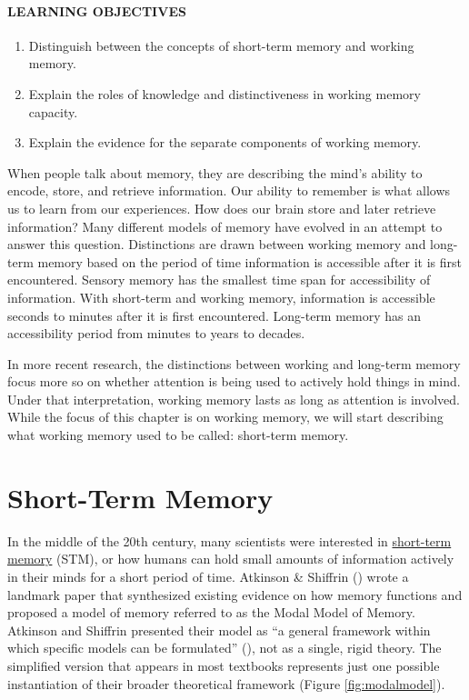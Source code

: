 \documentclass[
]{krantz}
\providecommand{\tightlist}{%
  \setlength{\itemsep}{0pt}\setlength{\parskip}{0pt}}
\begin{document}
\paragraph*{LEARNING OBJECTIVES}\label{learning-objectives-3}

\begin{enumerate}
\def\labelenumi{\arabic{enumi}.}
\tightlist
\item
  Distinguish between the concepts of short-term memory and working memory.
\item
  Explain the roles of knowledge and distinctiveness in working memory capacity.
\item
  Explain the evidence for the separate components of working memory.
\end{enumerate}

When people talk about memory, they are describing the mind's ability to encode, store, and retrieve information. Our ability to remember is what allows us to learn from our experiences. How does our brain store and later retrieve information? Many different models of memory have evolved in an attempt to answer this question. Distinctions are drawn between working memory and long-term memory based on the period of time information is accessible after it is first encountered. Sensory memory has the smallest time span for accessibility of information. With short-term and working memory, information is accessible seconds to minutes after it is first encountered. Long-term memory has an accessibility period from minutes to years to decades.

In more recent research, the distinctions between working and long-term memory focus more so on whether attention is being used to actively hold things in mind. Under that interpretation, working memory lasts as long as attention is involved. While the focus of this chapter is on working memory, we will start describing what working memory used to be called: short-term memory.

\section{Short-Term Memory}\label{short-term-memory}

In the middle of the 20th century, many scientists were interested in \hyperref[short-term-memory]{short-term memory} (STM), or how humans can hold small amounts of information actively in their minds for a short period of time. Atkinson \& Shiffrin () wrote a landmark paper that synthesized existing evidence on how memory functions and proposed a model of memory referred to as the Modal Model of Memory. Atkinson and Shiffrin presented their model as ``a general framework within which specific models can be formulated'' (), not as a single, rigid theory. The simplified version that appears in most textbooks represents just one possible instantiation of their broader theoretical framework (Figure \ref{fig:modalmodel}).
\end{document}
